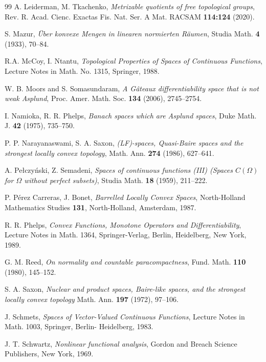 \documentclass[12pt]{amsart}
\theoremstyle{plain}
\theoremstyle{definition}
\theoremstyle{remark}
\begin{document}
\begin{thebibliography}{99}
 A. Leiderman, M. Tkachenko,
 \newblock \textit{Metrizable quotients of free topological groups},
 Rev. R. Acad. Cienc. Exactas Fis. Nat. Ser. A Mat. RACSAM \textbf{114:124} (2020).

 S. Mazur,
\newblock \textit{\"Uber konvexe Mengen in linearen normierten R\"aumen}, Studia Math. \textbf{4} (1933), 70--84.

 R.A. McCoy, I. Ntantu,
\newblock \textit{Topological Properties of Spaces of Continuous Functions}, Lecture Notes in Math. No. 1315, Springer, 1988.

 W. B. Moors and S. Somasundaram,
 \textit{A G\^ ateaux differentiability space that is not weak Asplund},
 Proc. Amer. Math. Soc. \textbf{134} (2006), 2745--2754.

 I. Namioka, R. R. Phelps,
\newblock \textit{Banach spaces which are Asplund spaces}, Duke Math. J. \textbf{42} (1975), 735--750.


 P. P. Narayanaswami, S. A. Saxon,
\newblock \textit{(LF)-spaces, Quasi-Baire spaces and the strongest locally convex topology}, Math. Ann.
 \textbf{274} (1986), 627--641.


 A. Pe{\l}czy\'nski, Z. Semadeni,
\newblock \textit{Spaces of continuous functions (III) (Spaces $C(\Omega)$ for $\Omega$ without perfect subsets)}, Studia Math. \textbf{18} (1959), 211--222.

 P. P\'{e}rez Carreras, J.  Bonet,
\newblock \textit{Barrelled Locally Convex Spaces}, North-Holland Mathematics Studies \textbf{131}, North-Holland, Amsterdam, 1987.

 R. R. Phelps,
\newblock \textit{Convex Functions, Monotone Operators and Differentiability},
Lecture Notes in Math. 1364, Springer-Verlag, Berlin, Heidelberg, New York, 1989.

 G. M. Reed,
\newblock \textit{On normality and countable paracompactness}, Fund. Math. \textbf{110} (1980), 145--152.

  S. A. Saxon, \textit{Nuclear and product spaces, Baire-like spaces, and the strongest locally convex topology} Math. Ann. \textbf{197} (1972), 97--106.

  J. Schmets, \textit{Spaces of Vector-Valued Continuous Functions}, Lecture Notes in Math. 1003, Springer, Berlin-
Heidelberg, 1983.


 J. T. Schwartz,
\newblock \textit{Nonlinear functional analysis}, Gordon and Breach Science Publishers, New York, 1969.


\end{thebibliography}
\end{document}
